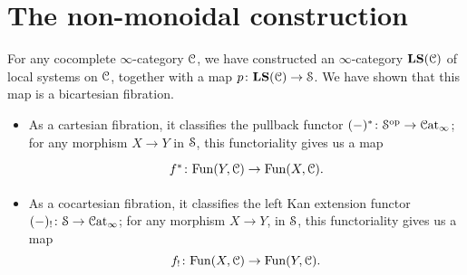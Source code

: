 \documentclass[main.tex]{subfiles}
\begin{document}
\section{The non-monoidal construction}
\label{sec:the_non_monoidal_construction}

For any cocomplete $\infty$-category $\category{C}$, we have constructed an $\infty$-category $\LS(\category{C})$ of local systems on $\category{C}$, together with a map $p\colon \LS(\category{C}) \to \S$. We have shown that this map is a bicartesian fibration.
\begin{itemize}
  \item As a cartesian fibration, it classifies the pullback functor $(-)^{*}\colon \S\op \to \ICat$; for any morphism $X \to Y$ in $\S$, this functoriality gives us a map
    \begin{equation*}
      \begin{tikzcd}
        f^{*}\colon \Fun(Y, \category{C}) \to \Fun(X, \category{C}).
      \end{tikzcd}
    \end{equation*}

  \item As a cocartesian fibration, it classifies the left Kan extension functor $(-)_{!}\colon \S \to \ICat$; for any morphism $X \to Y$, in $\S$, this functoriality gives us a map
    \begin{equation*}
      f_{!}\colon \Fun(X, \category{C}) \to \Fun(Y, \category{C}).
    \end{equation*}
\end{itemize}
\end{document}
